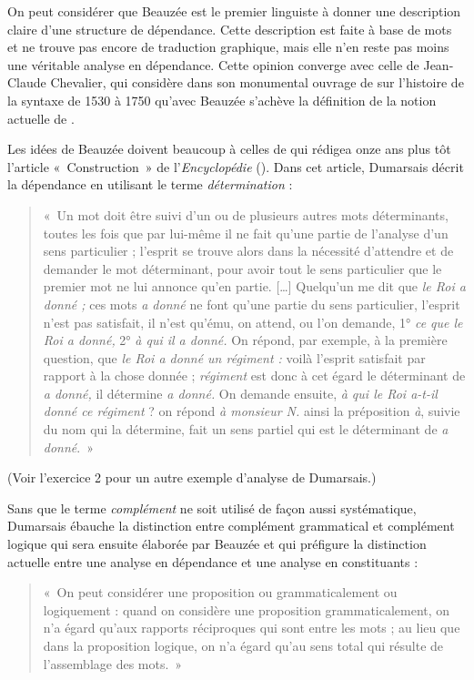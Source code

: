 {    On peut considérer que Beauzée est le premier linguiste à donner une description claire d’une structure de dépendance. Cette description est faite à base de mots et ne trouve pas encore de traduction graphique, mais elle n’en reste pas moins une véritable analyse en dépendance. Cette opinion converge avec celle de Jean-Claude Chevalier, qui considère dans son monumental ouvrage de \citeyear{chevalier1968histoire} sur l’histoire de la syntaxe de 1530 à 1750 qu’avec Beauzée s’achève la définition de la notion actuelle de .

    Les idées de Beauzée doivent beaucoup à celles de  qui rédigea onze ans plus tôt l’article «~Construction~» de l’\textit{Encyclopédie} (\citeyear{Dumarsais1754}). Dans cet article, Dumarsais décrit la dépendance en utilisant le terme \textit{détermination} : 
    \begin{quote}«~Un mot doit être suivi d’un ou de plusieurs autres mots déterminants, toutes les fois que par lui-même il ne fait qu’une partie de l’analyse d’un sens particulier ; l’esprit se trouve alors dans la nécessité d’attendre et de demander le mot déterminant, pour avoir tout le sens particulier que le premier mot ne lui annonce qu’en partie. […] Quelqu’un me dit que \textit{le Roi a donné ;} ces mots \textit{a donné} ne font qu’une partie du sens particulier, l’esprit n’est pas satisfait, il n’est qu’ému, on attend, ou l’on demande, 1° \textit{ce que le Roi a donné,} 2° \textit{à qui il a donné.} On répond, par exemple, à la première question, que \textit{le Roi a donné un régiment :} voilà l’esprit satisfait par rapport à la chose donnée ; \textit{régiment} est donc à cet égard le déterminant de \textit{a donné,} il détermine \textit{a donné.} On demande ensuite, \textit{à qui le Roi a-t-il donné ce régiment} ? on répond \textit{à monsieur N.} ainsi la préposition \textit{à}, suivie du nom qui la détermine, fait un sens partiel qui est le déterminant de \textit{a donné}.~» 
     \end{quote}
     (Voir l'exercice 2 pour un autre exemple d'analyse de Dumarsais.)

    Sans que le terme \textit{complément} ne soit utilisé de façon aussi systématique, Dumarsais ébauche la distinction entre complément grammatical et complément logique qui sera ensuite élaborée par Beauzée et qui préfigure la distinction actuelle entre une analyse en dépendance et une analyse en constituants : 
    \begin{quote}«~On peut considérer une proposition ou grammaticalement ou logiquement : quand on considère une proposition grammaticalement, on n’a égard qu’aux rapports réciproques qui sont entre les mots ; au lieu que dans la proposition logique, on n’a égard qu’au sens total qui résulte de l’assemblage des mots.~» \end{quote}

}
